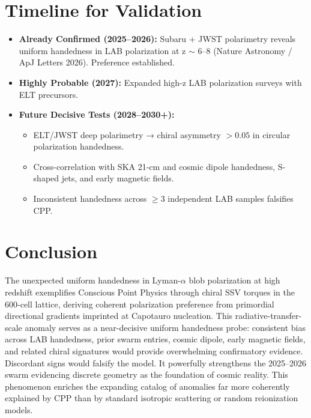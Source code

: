 \documentclass[11pt]{article}
\begin{document}
\section{Timeline for Validation}
\begin{itemize}
    \item \textbf{Already Confirmed (2025--2026):} Subaru + JWST polarimetry reveals uniform handedness in LAB polarization at z $\sim$ 6--8 (Nature Astronomy / ApJ Letters 2026). Preference established.
    \item \textbf{Highly Probable (2027):} Expanded high-z LAB polarization surveys with ELT precursors.
    \item \textbf{Future Decisive Tests (2028--2030+):}
    \begin{itemize}
        \item ELT/JWST deep polarimetry → chiral asymmetry $>0.05$ in circular polarization handedness.
        \item Cross-correlation with SKA 21-cm and cosmic dipole handedness, S-shaped jets, and early magnetic fields.
        \item Inconsistent handedness across $\geq 3$ independent LAB samples falsifies CPP.
    \end{itemize}
\end{itemize}

\section{Conclusion}
The unexpected uniform handedness in Lyman-$\alpha$ blob polarization at high redshift exemplifies Conscious Point Physics through chiral SSV torques in the 600-cell lattice, deriving coherent polarization preference from primordial directional gradients imprinted at Capotauro nucleation.  
This radiative-transfer-scale anomaly serves as a near-decisive uniform handedness probe: consistent bias across LAB handedness, prior swarm entries, cosmic dipole, early magnetic fields, and related chiral signatures would provide overwhelming confirmatory evidence. Discordant signs would falsify the model. It powerfully strengthens the 2025--2026 swarm evidencing discrete geometry as the foundation of cosmic reality.  
This phenomenon enriches the expanding catalog of anomalies far more coherently explained by CPP than by standard isotropic scattering or random reionization models.
\end{document}
